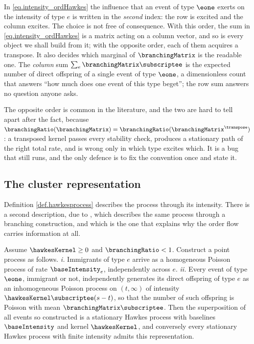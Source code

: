 \begin{remark}\label{remark.indexOrder}
 In \eqref{eq.intensity_ordHawkes} the influence that an event of type $\eone$ exerts on the
 intensity of type $e$ is written in the \emph{second} index:
 the row is excited and the column excites.
 The choice is not free of consequence.
 With this order, the sum in \eqref{eq.intensity_ordHawkes} is a matrix acting on a column
 vector, and so is every object we shall build from it;
 with the opposite order, each of them acquires a transpose.
 It also decides which marginal of $\branchingMatrix$ is the readable one.
 The \emph{column} sum $\sum_{e}\branchingMatrix\subscriptee$
 is the expected number of direct offspring of a single event of type $\eone$,
 a dimensionless count that answers ``how much does one event of this type beget'';
 the row sum answers no question anyone asks.

 The opposite order is common in the literature,
 and the two are hard to tell apart after the fact,
 because $\branchingRatio(\branchingMatrix) = \branchingRatio(\branchingMatrix^{\transpose})$:
 a transposed kernel passes every stability check,
 produces a stationary path of the right total rate,
 and is wrong only in which type excites which.
 It is a bug that still runs, and the only defence is to fix the convention once and state it.
\end{remark}

\subsection{The cluster representation}
\label{sec.clusterRepresentation}

Definition \ref{def.hawkesprocess} describes the process through its intensity.
There is a second description, due to \cite{HO74clu},
which describes the same process through a branching construction,
and which is the one that explains why the order flow carries information at all.

\begin{prop}\label{prop.clusterRepresentation}
 Assume $\hawkesKernel \geq 0$ and $\branchingRatio < 1$.
 Construct a point process as follows.
 \emph{i.} Immigrants of type $e$ arrive as a homogeneous Poisson process of rate
 $\baseIntensity_e$, independently across $e$.
 \emph{ii.} Every event of type $\eone$, immigrant or not,
 independently generates its direct offspring of type $e$
 as an inhomogeneous Poisson process on $(t,\infty)$ of intensity $\hawkesKernel\subscriptee(s-t)$,
 so that the number of such offspring is Poisson with mean $\branchingMatrix\subscriptee$.
 Then the superposition of all events so constructed is a stationary Hawkes process
 with baselines $\baseIntensity$ and kernel $\hawkesKernel$,
 and conversely every stationary Hawkes process with finite intensity admits this representation.
\end{prop}

